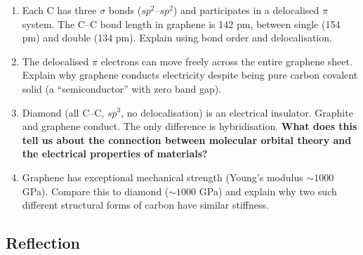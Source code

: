 \documentclass[12pt, a4paper]{book}
\begin{document}
\begin{deepbox}
\begin{enumerate}[label=\textbf{D\arabic*.}]
    \begin{enumerate}[label=(\alph*)]
      \item Each C has three $\sigma$ bonds ($sp^2$--$sp^2$)
            and participates in a delocalised $\pi$ system.
            The C--C bond length in graphene is 142 pm,
            between single (154 pm) and double (134 pm).
            Explain using bond order and delocalisation.
      \item The delocalised $\pi$ electrons can move freely
            across the entire graphene sheet.
            Explain why graphene conducts electricity
            despite being pure carbon covalent solid
            (a ``semiconductor'' with zero band gap).
      \item Diamond (all C--C, $sp^3$, no delocalisation)
            is an electrical insulator. Graphite and graphene
            conduct. The only difference is hybridisation.
            \textbf{What does this tell us about the connection
            between molecular orbital theory and the
            electrical properties of materials?}
      \item Graphene has exceptional mechanical strength
            (Young's modulus $\sim 1000$ GPa).
            Compare this to diamond ($\sim 1000$ GPa)
            and explain why two such different structural forms
            of carbon have similar stiffness.
    \end{enumerate}

\end{enumerate}
\end{deepbox}

\subsection*{Reflection}
\end{document}

